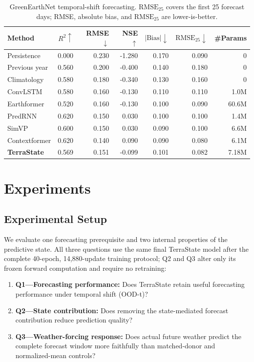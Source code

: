 \documentclass[letterpaper]{article} %
\begin{document}
\begin{table}[t]
\centering
{\small
\setlength{\tabcolsep}{7.0pt}
\renewcommand{\arraystretch}{0.70}
\begin{tabular}{lrrrrrr}
\toprule
Method & $R^2\uparrow$ & RMSE$\downarrow$ & NSE$\uparrow$ &
$|\mathrm{Bias}|\downarrow$ & $\mathrm{RMSE}_{25}\downarrow$ &
\#Params\\
\midrule
Persistence & 0.000 & 0.230 & -1.280 & 0.170 & 0.090 & 0\\
Previous year & 0.560 & 0.200 & -0.400 & 0.140 & 0.180 & 0\\
Climatology & 0.580 & 0.180 & -0.340 & 0.130 & 0.160 & 0\\
ConvLSTM & 0.580 & 0.160 & -0.130 & 0.110 & 0.110 & 1.0M\\
Earthformer & 0.520 & 0.160 & -0.130 & 0.100 & 0.090 & 60.6M\\
PredRNN & 0.620 & 0.150 & 0.030 & 0.100 & 0.100 & 1.4M\\
SimVP & 0.600 & 0.150 & 0.030 & 0.090 & 0.100 & 6.6M\\
Contextformer & 0.620 & 0.140 & 0.090 & 0.090 & 0.080 & 6.1M\\
\textbf{TerraState} & 0.569 & 0.151 & -0.099 & 0.101 & 0.082 & 7.18M\\
\bottomrule
\end{tabular}
}
\caption{GreenEarthNet temporal-shift forecasting. $\mathrm{RMSE}_{25}$ covers
the first 25 forecast days; RMSE, absolute bias, and $\mathrm{RMSE}_{25}$ are
lower-is-better.}
\label{tab:forecast}
\end{table}

\section{Experiments}

\subsection{Experimental Setup}

We evaluate one forecasting prerequisite and two internal properties of the
predictive state. All three questions use the same final TerraState model
after the complete 40-epoch, 14,880-update training protocol; Q2 and Q3 alter
only its frozen forward computation and require no retraining:
\begin{enumerate}
    \item \textbf{Q1---Forecasting performance:} Does TerraState retain useful
    forecasting performance under temporal shift (OOD-t)?
    \item \textbf{Q2---State contribution:} Does removing the state-mediated
    forecast contribution reduce prediction quality?
    \item \textbf{Q3---Weather-forcing response:} Does actual future weather
    predict the complete forecast window more faithfully than matched-donor
    and normalized-mean controls?
\end{enumerate}
\end{document}
